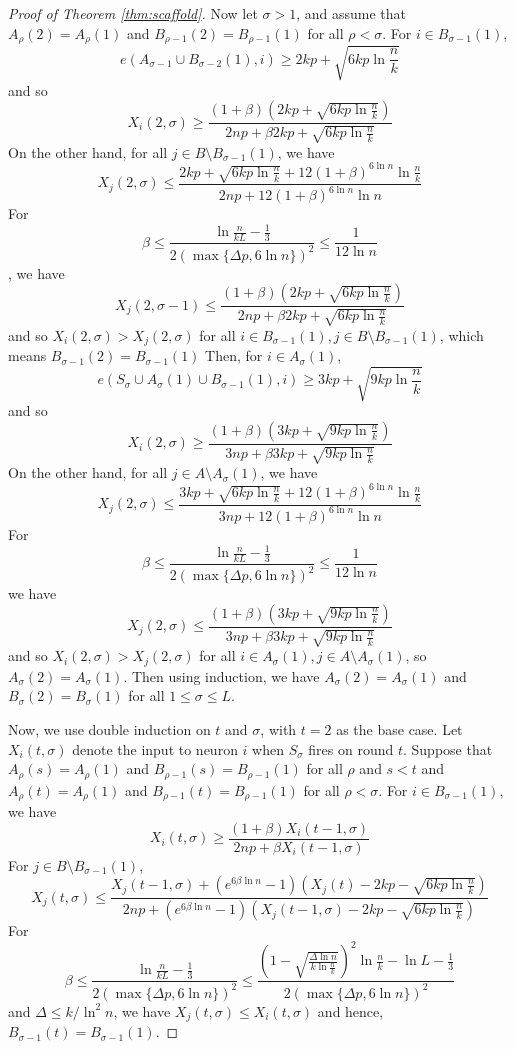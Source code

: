 \documentclass[12pt,nosubfloats]{alt2024} %
\newcommand{\1}{\mathbbm{1}}
\begin{document}
\begin{proof}[Proof of Theorem \ref{thm:scaffold}]
Now let $\sigma > 1$, and assume that $A_{\rho}(2) = A_{\rho}(1)$ and $B_{\rho - 1}(2) = B_{\rho - 1}(1)$ for all $\rho < \sigma$. For $i \in B_{\sigma-1}(1)$, 
\[e(A_{\sigma-1} \cup B_{\sigma-2}(1), i) \ge 2kp + \sqrt{6kp \ln \frac{n}{k}}\]
and so
\[X_i(2, \sigma) \ge \frac{(1 + \beta) (2kp + \sqrt{6kp \ln \frac{n}{k}})}{2np + \beta 2kp + \sqrt{6kp \ln \frac{n}{k}}}\]
 On the other hand, for all $j \in B \setminus B_{\sigma-1}(1)$, we have
\[X_j(2, \sigma) \le \frac{2kp + \sqrt{6kp \ln \frac{n}{k}} + 12(1 + \beta)^{6 \ln n} \ln \frac{n}{k}}{2np + 12(1 + \beta)^{6 \ln n}\ln n}\]
For 
\[\beta \le \frac{ \ln \frac{n}{kL} - \frac{1}{3}}{2 (\max \{\Delta p, 6 \ln n\})^2 } \le \frac{1}{12 \ln n} \], we have
\[X_j(2, \sigma-1) \le \frac{(1 + \beta) (2kp + \sqrt{6kp \ln \frac{n}{k}})}{2np + \beta 2kp + \sqrt{6kp \ln \frac{n}{k}}}\]
and so $X_i(2, \sigma) > X_j(2, \sigma)$ for all $i \in B_{\sigma-1}(1), j \in B \setminus B_{\sigma-1}(1)$, which means $B_{\sigma-1}(2) = B_{\sigma-1}(1)$
Then, for $i \in A_{\sigma}(1)$, 
\[e(S_{\sigma} \cup A_{\sigma}(1) \cup B_{\sigma-1}(1), i ) \ge 3kp + \sqrt{9kp \ln \frac{n}{k}}\] 
and so
\[X_i(2, \sigma) \ge \frac{(1 + \beta) (3kp + \sqrt{9kp \ln \frac{n}{k}})}{3np + \beta 3kp + \sqrt{9kp \ln \frac{n}{k}}}\]
 On the other hand, for all $j \in A \setminus A_{\sigma}(1)$, we have
\[X_j(2, \sigma) \le \frac{3kp + \sqrt{6kp \ln \frac{n}{k}} + 12(1 + \beta)^{6 \ln n} \ln \frac{n}{k}}{3np + 12(1 + \beta)^{6 \ln n}\ln n}\]
For 
\[\beta \le \frac{ \ln \frac{n}{kL} - \frac{1}{3}}{2 (\max \{\Delta p, 6 \ln n\})^2 } \le \frac{1}{12 \ln n} \]
we have
\[X_j(2, \sigma) \le \frac{(1 + \beta) (3kp + \sqrt{9kp \ln \frac{n}{k}})}{3np + \beta 3kp + \sqrt{9kp \ln \frac{n}{k}}}\]
and so $X_i(2, \sigma) > X_j(2, \sigma)$ for all $i \in A_{\sigma}(1), j \in A \setminus A_{\sigma}(1)$, so $A_{\sigma}(2) = A_{\sigma}(1)$. Then using induction, we have $A_\sigma(2) = A_\sigma(1)$ and $B_\sigma(2) = B_\sigma(1)$ for all $1 \le \sigma \le L$.

Now, we use double induction on $t$ and $\sigma$, with $t = 2$ as the base case. Let $X_i(t, \sigma)$ denote the input to neuron $i$ when $S_\sigma$ fires on round $t$. Suppose that $A_{\rho}(s) = A_{\rho}(1)$ and $B_{\rho-1}(s) = B_{\rho-1}(1)$ for all $\rho$ and $s < t$ and $A_{\rho}(t) = A_{\rho}(1)$ and $B_{\rho - 1}(t) = B_{\rho-1}(1)$ for all $\rho < \sigma$. For $i \in B_{\sigma-1}(1)$, we have
\[X_i(t, \sigma) \ge \frac{(1 + \beta) X_i(t-1, \sigma)}{2np + \beta X_i(t-1, \sigma)}\]
For $j \in B \setminus B_{\sigma-1}(1)$,
\[X_j(t, \sigma) \le \frac{X_j(t-1, \sigma) + (e^{6\beta \ln n} - 1)(X_j(t) - 2kp - \sqrt{6 kp \ln \frac{n}{k}})}{2np + (e^{6\beta \ln n} - 1) (X_j(t-1, \sigma) - 2kp - \sqrt{6 kp \ln \frac{n}{k}})}\]
For 
\[\beta \le \frac{ \ln \frac{n}{kL} - \frac{1}{3}}{2 (\max \{\Delta p, 6 \ln n\})^2 } \le \frac{(1 - \sqrt{\frac{\Delta \ln n}{k\ln \frac{n}{k}}})^2 \ln \frac{n}{k} - \ln L - \frac{1}{3}}{2 (\max \{\Delta p, 6 \ln n\})^2 }\]
and $\Delta \le k / \ln^2 n$, we have $X_j(t, \sigma) \le X_i(t, \sigma)$ and hence, $B_{\sigma-1}(t) = B_{\sigma-1}(1)$.


\end{proof}
\end{document}
